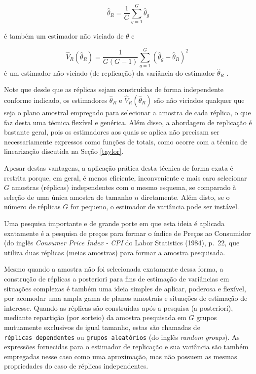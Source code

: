 \documentclass[
  12pt,
  brazilian,
]{book}
\theoremstyle{definition}
\theoremstyle{definition}
\theoremstyle{definition}
\theoremstyle{definition}
\theoremstyle{remark}
\begin{document}
\[
\widehat{\theta }_{R}=\frac{1}{G}\sum_{g=1}^{G}\widehat{\theta }_{g} 
\]

é também um estimador não viciado de \(\theta\) e

\[
\widehat{V}_{R} \left( \widehat{\theta }_{R}\right) = \frac{1}{G \left(
G-1 \right)} \sum_{g=1}^{G} \left( \widehat{\theta }_{g} - \widehat{\theta}_{R} \right)^{2}  \,\, \label{eq:estpa23}
\]
é um estimador não viciado (de replicação) da variância do estimador \(\widehat{\theta}_{R}\) .

Note que desde que as réplicas sejam construídas de forma independente conforme indicado, os estimadores \(\widehat{\theta }_{R}\) e \(\widehat{V}_{R}\left( \widehat{\theta }_{R}\right)\) são não viciados qualquer que seja o plano amostral empregado para selecionar a amostra de cada réplica, o que faz desta uma técnica
flexível e genérica. Além disso, a abordagem de replicação é bastante geral, pois os estimadores aos quais se aplica não precisam ser necessariamente expressos como funções de totais, como ocorre com a técnica de linearização discutida na Seção
\ref{taylor}.

Apesar destas vantagens, a aplicação prática desta técnica de forma exata é restrita porque, em geral, é menos eficiente, inconveniente e mais caro selecionar \(G\) amostras (réplicas) independentes com o mesmo esquema, se comparado à seleção de uma única amostra de tamanho \(n\) diretamente. Além disto, se o número de
réplicas \(G\) for pequeno, o estimador de variância pode ser instável.

Uma pesquisa importante e de grande porte em que esta ideia é aplicada exatamente é a pesquisa de preços para formar o índice de Preços ao Consumidor (do inglês
\emph{Consumer Price Index - CPI} do Labor Statistics (1984), p.~22, que utiliza duas réplicas (meias amostras) para formar a amostra pesquisada.

Mesmo quando a amostra não foi selecionada exatamente dessa forma, a construção de réplicas a posteriori para fins de estimação de variâncias em situações complexas é também uma ideia simples de aplicar, poderosa e flexível, por acomodar uma ampla gama de planos amostrais e situações de estimação de interesse. Quando as réplicas são construídas após a pesquisa (a posteriori), mediante repartição (por sorteio) da amostra pesquisada em \(G\) grupos mutuamente exclusivos de igual tamanho, estas são chamadas de \texttt{réplicas\ dependentes} ou \texttt{grupos\ aleatórios} (do inglês \emph{random groups}). As expressões fornecidas para o estimador de replicação e sua
variância são também empregadas nesse caso como uma aproximação, mas não possuem as mesmas propriedades do caso de réplicas independentes.
\end{document}
